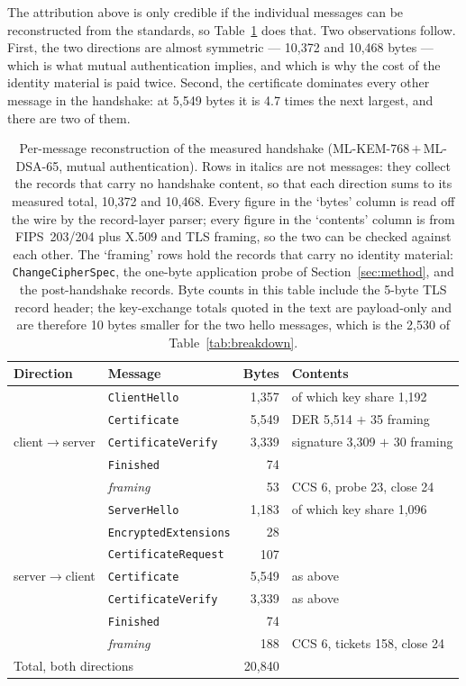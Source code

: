 \documentclass[drones,article,submit,pdftex,moreauthors]{Definitions/mdpi}
\newcommand{\mlkem}{ML-KEM}
\newcommand{\mldsa}{ML-DSA}
\newcommand{\tls}{TLS}
\begin{document}
The attribution above is only credible if the individual messages can be
reconstructed from the standards, so Table~\ref{tab:messages} does that.
Two observations follow. First, the two directions are almost symmetric
--- 10{,}372 and 10{,}468 bytes --- which is what mutual authentication
implies, and which is why the cost of the identity material is paid
twice. Second, the certificate dominates every other message in the
handshake: at 5{,}549 bytes it is 4.7 times the next largest, and there
are two of them.

\begin{table}[H]
\caption{Per-message reconstruction of the measured handshake
(\mlkem{}-768\,$+$\,\mldsa{}-65, mutual authentication). Rows in italics are
not messages: they collect the records that carry no handshake content,
so that each direction sums to its measured total, 10{,}372 and
10{,}468. Every figure in
the `bytes' column is read off the wire by the record-layer parser;
every figure in the `contents' column is from FIPS~203/204 plus X.509
and \tls{} framing, so the two can be checked against each other. The
`framing' rows hold the records that carry no identity material:
\texttt{ChangeCipherSpec}, the one-byte application probe of
Section~\ref{sec:method}, and the post-handshake records. Byte counts in
this table include the 5-byte \tls{} record header; the key-exchange
totals quoted in the text are payload-only and are therefore 10 bytes
smaller for the two hello messages, which is the 2{,}530 of
Table~\ref{tab:breakdown}.} 
\label{tab:messages}
\centering
\small
\begin{tabular}{llrl}
\toprule
Direction & Message & Bytes & Contents \\
\midrule
\multirow{5}{*}{client$\to$server}
 & \texttt{ClientHello}      & 1{,}357 & of which key share 1{,}192 \\
 & \texttt{Certificate}      & 5{,}549 & DER 5{,}514 $+$ 35 framing \\
 & \texttt{CertificateVerify}& 3{,}339 & signature 3{,}309 $+$ 30 framing \\
 & \texttt{Finished}         & 74      & \\
 & \emph{framing}            & 53      & CCS 6, probe 23, close 24 \\
\midrule
\multirow{7}{*}{server$\to$client}
 & \texttt{ServerHello}      & 1{,}183 & of which key share 1{,}096 \\
 & \texttt{EncryptedExtensions} & 28   & \\
 & \texttt{CertificateRequest} & 107 & \\
 & \texttt{Certificate}      & 5{,}549 & as above \\
 & \texttt{CertificateVerify}& 3{,}339 & as above \\
 & \texttt{Finished}         & 74      & \\
 & \emph{framing}            & 188     & CCS 6, tickets 158, close 24 \\
\midrule
\multicolumn{2}{l}{Total, both directions} & 20{,}840 & \\
\bottomrule
\end{tabular}
\end{table}
\end{document}
